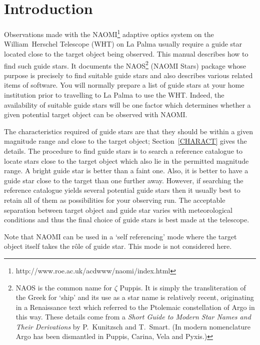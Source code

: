 \documentclass[twoside,11pt]{article}
\newcommand{\htmladdnormallinkfoot}[2]{#1\footnote{#2}}
\newcommand{\xlabel}[1]{}
\renewcommand{\_}{\texttt{\symbol{95}}}
\renewcommand{\thepage}{\roman{page}}
\begin{document}
\cleardoublepage
\renewcommand{\thepage}{\arabic{page}}
\setcounter{page}{1}

\section{\xlabel{INTRO}\label{INTRO}Introduction}

Observations made with the \htmladdnormallinkfoot{NAOMI}
{http://www.roe.ac.uk/acdwww/naomi/index.html}
adaptive optics system on the William~Herschel Telescope (WHT) on La Palma
usually require a guide star located close to the target object being
observed.  This manual describes how to find such guide stars.  It
documents the NAOS\footnote{NAOS is the common name for $\zeta$ Puppis.
It is simply the transliteration of the Greek for `ship' and its use
as a star name is relatively recent, originating in a Renaissance text
which referred to the Ptolemaic constellation of Argo in this way.  These
details come from a {\it Short Guide to Modern Star Names and Their
Derivations} by P.~Kunitzsch and T.~Smart\cite{KUNITZSCH86}. (In
modern nomenclature Argo has been dismantled in Puppis, Carina, Vela and
Pyxis.)} (NAOMI Stars) package whose purpose is precisely to find suitable
guide stars and also describes various related items of software.
You will normally prepare a list of guide stars at your home institution
prior to travelling to La Palma to use the WHT.  Indeed, the availability
of suitable guide stars will be one factor which determines whether a
given potential target object can be observed with NAOMI.

The characteristics required of guide stars are that they should be within
a given magnitude range and close to the target object; Section~\ref{CHARACT}
gives the details.  The procedure to find guide stars is to search a
reference catalogue to locate stars close to the target object which also
lie in the permitted magnitude range.  A bright guide star is better than
a faint one.  Also, it is better to have a guide star close to the target
than one further away.  However, if searching the reference catalogue
yields several potential guide stars then it usually best to retain all of
them as possibilities for your observing run.  The acceptable separation
between target object and guide star varies with meteorological conditions
and thus the final choice of guide stars is best made at the telescope.

Note that NAOMI can be used in a `self referencing' mode where the
target object itself takes the r\^{o}le of guide star.  This mode is
not considered here.
\end{document}
